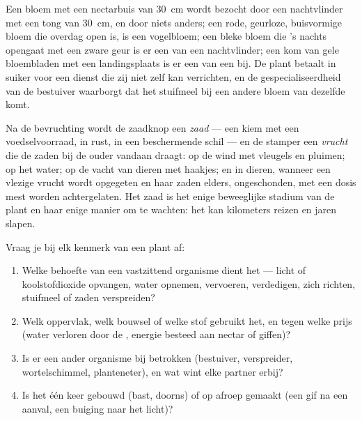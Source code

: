 \begin{example}\label{ex:g12:plant-rooted-life:match}
Een bloem met een nectarbuis van \qty{30}{cm} wordt bezocht door een nachtvlinder
met een tong van \qty{30}{cm}, en door niets anders; een rode, geurloze,
buisvormige bloem die overdag open is, is een vogelbloem; een bleke bloem
die 's nachts opengaat met een zware geur is er een van een nachtvlinder;
een kom van gele bloembladen met een landingsplaats is er een van een bij.
De plant betaalt in suiker voor een dienst die zij niet zelf kan
verrichten, en de gespecialiseerdheid van de bestuiver waarborgt dat het
stuifmeel bij een andere bloem van dezelfde  komt.
\end{example}

\begin{proposition}\label{prop:g12:plant-rooted-life:dispersal}
Na de bevruchting wordt de zaadknop een \emph{zaad} --- een kiem met een
voedselvoorraad, in rust, in een beschermende schil --- en de stamper een
\emph{vrucht} die de zaden bij de ouder vandaan draagt: op de wind met
vleugels en pluimen; op het water; op de vacht van dieren met haakjes; en
in dieren, wanneer een vlezige vrucht wordt opgegeten en haar zaden
elders, ongeschonden, met een dosis mest worden achtergelaten. Het zaad is
het enige beweeglijke stadium van de plant en haar enige manier om te
wachten: het kan kilometers reizen en jaren slapen.
\end{proposition}
\admitted

\begin{method}\label{met:g12:plant-rooted-life:read}
Vraag je bij elk kenmerk van een plant af:
\begin{enumerate}
  \item Welke behoefte van een vastzittend organisme dient het --- licht
        of koolstofdioxide opvangen, water opnemen, vervoeren,
        verdedigen, zich richten, stuifmeel of zaden verspreiden?
  \item Welk oppervlak, welk bouwsel of welke stof gebruikt het, en tegen
        welke prijs (water verloren door de , energie besteed
        aan nectar of giffen)?
  \item Is er een ander organisme bij betrokken (bestuiver, verspreider,
        wortelschimmel, planteneter), en wat wint elke partner erbij?
  \item Is het één keer gebouwd (bast, doorns) of op afroep gemaakt (een
        gif na een aanval, een buiging naar het licht)?
\end{enumerate}
\end{method}

